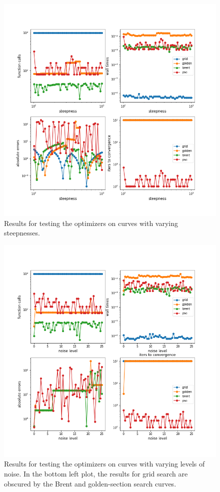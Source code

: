 \documentclass[letterpaper,12pt,twocolumn]{article}
\begin{document}
\begin{figure}
    \centering
    \includegraphics[width=\textwidth]{../figures/steepness-res.png}
    \caption{Results for testing the optimizers on curves with varying steepnesses.}
    \label{fig:steep-res}
\end{figure}

\begin{figure}
    \centering
    \includegraphics[width=\textwidth]{../figures/noisy-res.png}
    \caption{Results for testing the optimizers on curves with varying levels of noise. In the bottom left plot, the results for grid search are obscured by the Brent and golden-section search curves.}
    \label{fig:noisy-res}
\end{figure}
\end{document}
